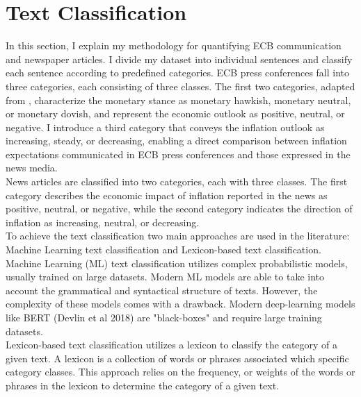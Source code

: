 \documentclass[review]{elsarticle}
\begin{document}
\section{Text Classification} \label{sec:Quantification of Text Data}
In this section, I explain my methodology for quantifying ECB communication and newspaper articles. I divide my dataset into individual sentences and classify each sentence according to predefined categories. ECB press conferences fall into three categories, each consisting of three classes. The first two categories, adapted from \cite{PicaultRenault2017}, characterize the monetary stance as monetary hawkish, monetary neutral, or monetary dovish, and represent the economic outlook as positive, neutral, or negative. I introduce a third category that conveys the inflation outlook as increasing, steady, or decreasing, enabling a direct comparison between inflation expectations communicated in ECB press conferences and those expressed in the news media.
\\
News articles are classified into two categories, each with three classes. The first category describes the economic impact of inflation reported in the news as positive, neutral, or negative, while the second category indicates the direction of inflation as increasing, neutral, or decreasing.
\\
To achieve the text classification two main approaches are used in the literature: Machine Learning text classification and Lexicon-based text classification. Machine Learning (ML) text classification utilizes complex probabilistic models, usually trained on large datasets. Modern ML models are able to take into account the grammatical and syntactical structure of texts. However, the complexity of these models comes with a drawback. Modern deep-learning models like BERT (Devlin et al 2018) are "black-boxes" and require large training datasets.
\\
Lexicon-based text classification utilizes a lexicon to classify the category of a given text. A lexicon is a collection of words or phrases associated which specific category classes. This approach relies on the frequency, or weights of the words or phrases in the lexicon to determine the category of a given text. 
\\
\end{document}

